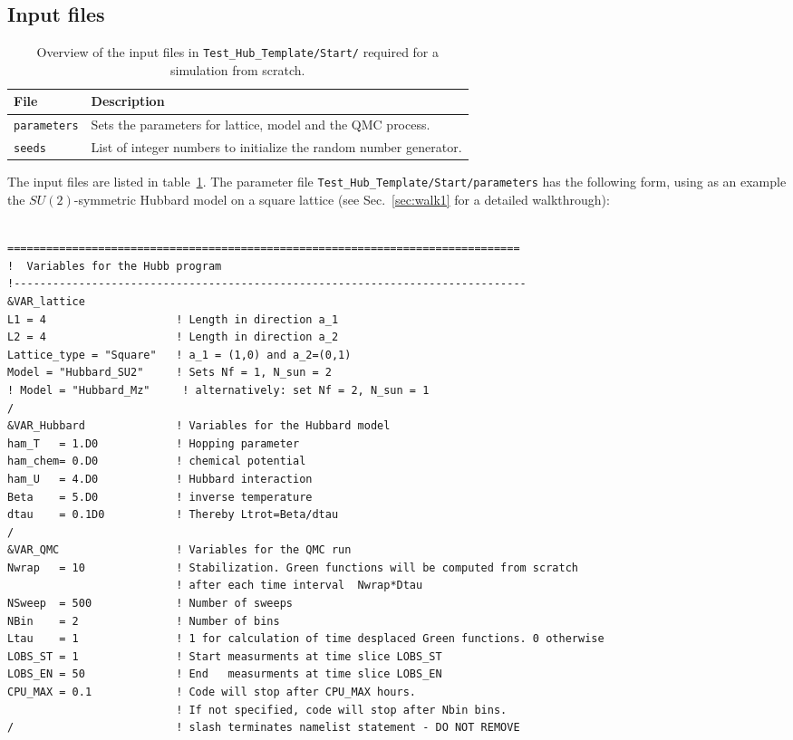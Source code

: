 \subsection{Input files}\label{sec:input}
%
\begin{table}[h]
   \begin{tabular}{l l}
   File & Description \\\hline
  \texttt{parameters} &  Sets the parameters for lattice, model and the QMC process.\\
  \texttt{seeds} & List of integer numbers to initialize the random number generator.
   \end{tabular}
   \caption{Overview of the input files in \texttt{Test\_Hub\_Template/Start/} required for a simulation from scratch. \label{table:input}}
\end{table}
%
The input files are listed in table~\ref{table:input}. 
The parameter file \texttt{Test\_Hub\_Template/Start/parameters} has the following form, 
using as an example  the $SU(2)$-symmetric Hubbard model on a square lattice (see Sec.~\ref{sec:walk1} for a detailed walkthrough):
%
\begin{lstlisting} 

===============================================================================
!  Variables for the Hubb program
!-------------------------------------------------------------------------------
&VAR_lattice
L1 = 4                    ! Length in direction a_1
L2 = 4                    ! Length in direction a_2
Lattice_type = "Square"	  ! a_1 = (1,0) and a_2=(0,1)
Model = "Hubbard_SU2"     ! Sets Nf = 1, N_sun = 2
! Model = "Hubbard_Mz"     ! alternatively: set Nf = 2, N_sun = 1
/
&VAR_Hubbard              ! Variables for the Hubbard model
ham_T   = 1.D0            ! Hopping parameter
ham_chem= 0.D0            ! chemical potential
ham_U   = 4.D0            ! Hubbard interaction
Beta    = 5.D0            ! inverse temperature
dtau    = 0.1D0           ! Thereby Ltrot=Beta/dtau
/
&VAR_QMC                  ! Variables for the QMC run
Nwrap   = 10              ! Stabilization. Green functions will be computed from scratch 
                          ! after each time interval  Nwrap*Dtau
NSweep  = 500             ! Number of sweeps
NBin    = 2               ! Number of bins
Ltau    = 1               ! 1 for calculation of time desplaced Green functions. 0 otherwise
LOBS_ST = 1               ! Start measurments at time slice LOBS_ST
LOBS_EN = 50              ! End   measurments at time slice LOBS_EN
CPU_MAX = 0.1             ! Code will stop after CPU_MAX hours. 
                          ! If not specified, code will stop after Nbin bins.
/                         ! slash terminates namelist statement - DO NOT REMOVE
\end{lstlisting}
%
